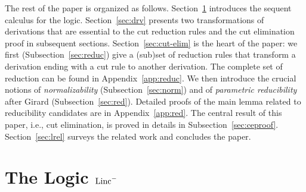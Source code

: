 \documentclass[preprint]{elsarticle}
\newcommand{\Linc}{{\rm Linc}^-}
\begin{document}
The rest of the paper is organized as follows. Section~\ref{sec:linc}
introduces the sequent calculus for the logic.  Section~\ref{sec:drv}
presents two transformations of derivations that are essential to the
cut reduction rules and the cut elimination proof in subsequent
sections. Section~\ref{sec:cut-elim} is the heart of the paper: we
first (Subsection~\ref{sec:reduc}) give a (sub)set of reduction rules
that transform a derivation ending with a cut rule to another
derivation. The complete set of reduction can be found in
Appendix~\ref{app:reduc}. We then introduce the crucial notions of
\emph{normalizability} (Subsection~\ref{sec:norm}) and of
\emph{parametric reducibility} after Girard
(Subsection~\ref{sec:red}). Detailed proofs of the main lemma related
to reducibility candidates are in Appendix~\ref{app:red}.  The
central result of this paper, i.e., cut elimination, is proved in
details in Subsection~\ref{sec:ceproof}. Section~\ref{sec:lrel} surveys the related work and
concludes the paper.

\section{The Logic $\Linc$}
\label{sec:linc}
\end{document}
